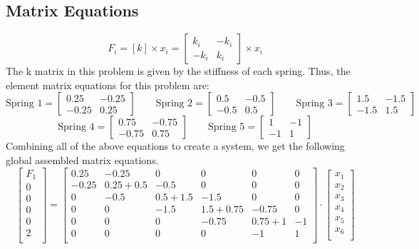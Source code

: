\documentclass[8pt]{article}
\begin{document}
\subsection{Matrix Equations}
\[
F_i = [k] \times x_i = 
\begin{bmatrix}
    k_i & -k_i \\
    -k_i & k_i
\end{bmatrix}
\times x_i
\]
The k matrix in this problem is given by the stiffness of each spring. Thus, the element matrix equations for this problem are:
\[
\mbox{Spring 1}= 
\begin{bmatrix}
    0.25 & -0.25 \\
    -0.25 & 0.25
\end{bmatrix}
\quad \quad
\mbox{Spring 2}=
\begin{bmatrix}
    0.5 & -0.5 \\
    -0.5 & 0.5
\end{bmatrix}
\quad \quad
\mbox{Spring 3}=
\begin{bmatrix}
    1.5 & -1.5 \\
    -1.5 & 1.5
\end{bmatrix}
\]
\[
\mbox{Spring 4}=
\begin{bmatrix}
    0.75 & -0.75 \\
    -0.75 & 0.75
\end{bmatrix}
\quad \quad
\mbox{Spring 5}=
\begin{bmatrix}
    1 & -1 \\
    -1 & 1
\end{bmatrix}
\]
Combining all of the above equations to create a system, we get the following global assembled matrix equations.
\[
    \begin{bmatrix}
        F_1 \\
        0 \\
        0 \\
        0 \\
        0 \\
        2 \\
    \end{bmatrix}
    =
    \begin{bmatrix}
        0.25 & -0.25 & 0 & 0 & 0 & 0 \\
        -0.25 & 0.25 + 0.5 & -0.5 & 0 & 0 & 0 \\
        0 & -0.5 & 0.5 + 1.5 & -1.5 & 0 & 0 \\
        0 & 0 & -1.5 & 1.5 + 0.75 & -0.75 & 0 \\
        0 & 0 & 0 & -0.75 & 0.75 + 1 & -1 \\
        0 & 0 & 0 & 0 & -1 & 1 \\
    \end{bmatrix}
    \cdot
    \begin{bmatrix}
        x_1 \\
        x_2 \\
        x_3 \\
        x_4 \\
        x_5 \\
        x_6 \\
    \end{bmatrix}
\]
\end{document}
